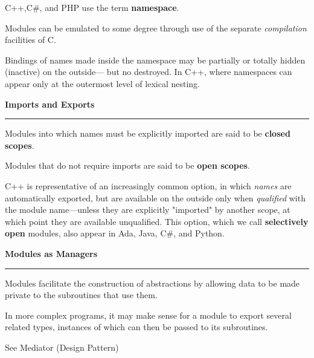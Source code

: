 \vskip 6pt
C++,C$\#$, and PHP use the term {\bf namespace}.

\vskip 6pt
Modules can be emulated to some degree through use of the separate {\it compilation} facilities of C.

\vskip 6pt
Bindings of names made inside the namespace may be partially or totally hidden (inactive) on the outside--- but no destroyed. In C++, where namespaces can appear only at the outermost level of lexical nesting.

\vskip 12pt
{\bf Imports and Exports}
\vskip 1mm
\hrule

\vskip 6pt
Modules into which names must be explicitly imported are said to be {\bf closed scopes}.

\vskip 1mm
Modules that do not require imports are said to be {\bf open scopes}.

\vskip 6pt
C++ is representative of an increasingly common option, in which {\it names} are automatically exported, but are available on the outside only when {\it qualified} with the module name---unless they are explicitly "imported" by another scope, at which point they are available unqualified. This option, which we call {\bf selectively open} modules, also appear in Ada, Java, C$\#$, and Python.


\vskip 72pt
{\bf Modules as Managers}
\vskip 1mm
\hrule

\vskip 6pt
Modules facilitate the construction of abstractions by allowing data to be made private to the subroutines that use them.

\vskip 6pt
In more complex programs, it may make sense for a module to export several related types, instances of which can then be passed to its subroutines.

\vskip 6pt
See Mediator (Design Pattern)

\vfill\eject
\bye
